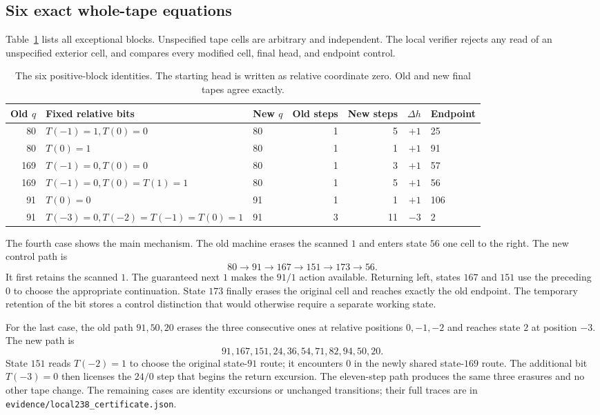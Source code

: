 \documentclass[11pt]{article}
\theoremstyle{definition}\newtheorem{definition}[theorem]{Definition}
\newcommand{\file}[1]{\nolinkurl{#1}}
\begin{document}
\subsection{Six exact whole-tape equations}

Table~\ref{tab:blocks} lists all exceptional blocks.  Unspecified tape cells
are arbitrary and independent.  The local verifier rejects any read of an
unspecified exterior cell, and compares every modified cell, final head,
and endpoint control.

\begin{table}[htbp]
\centering\small
\begin{tabular}{rllrrrl}
\toprule
Old $q$ & Fixed relative bits & New $q$ & Old steps & New steps & $\Delta h$ & Endpoint\\
\midrule
80  & $T(-1)=1,T(0)=0$ &80&1&5&$+1$&25\\
80  & $T(0)=1$ &80&1&1&$+1$&91\\
169 & $T(-1)=0,T(0)=0$ &80&1&3&$+1$&57\\
169 & $T(-1)=0,T(0)=T(1)=1$ &80&1&5&$+1$&56\\
91  & $T(0)=0$ &91&1&1&$+1$&106\\
91  & $T(-3)=0,T(-2)=T(-1)=T(0)=1$ &91&3&11&$-3$&2\\
\bottomrule
\end{tabular}
\caption{The six positive-block identities.  The starting head is written
as relative coordinate zero.  Old and new final tapes agree exactly.}
\label{tab:blocks}
\end{table}

The fourth case shows the main mechanism.  The old machine erases the
scanned $1$ and enters state $56$ one cell to the right.  The new control
path is
\[
 80\longrightarrow91\longrightarrow167\longrightarrow151
 \longrightarrow173\longrightarrow56.
\]
It first retains the scanned $1$.  The guaranteed next $1$ makes the
$91/1$ action available.  Returning left, states $167$ and $151$ use the
preceding $0$ to choose the appropriate continuation.  State $173$ finally
erases the original cell and reaches exactly the old endpoint.  The
temporary retention of the bit stores a control distinction that would
otherwise require a separate working state.

For the last case, the old path $91,50,20$ erases the three consecutive
ones at relative positions $0,-1,-2$ and reaches state $2$ at position $-3$.
The new path is
\[
91,167,151,24,36,54,71,82,94,50,20.
\]
State $151$ reads $T(-2)=1$ to choose the original state-$91$ route;
it encounters $0$ in the newly shared state-$169$ route.  The additional
bit $T(-3)=0$ then licenses the $24/0$ step that begins the return excursion.
The eleven-step path produces the same three
erasures and no other tape change.  The remaining cases are identity
excursions or unchanged transitions; their full traces are in
\file{evidence/local238_certificate.json}.
\end{document}
